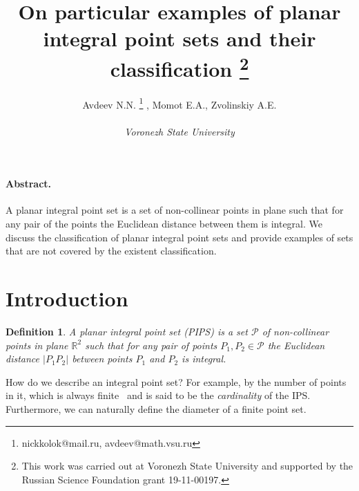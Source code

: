 \documentclass[12pt]{article}
\theoremstyle{theorem}
\theoremstyle{dfn}
\newtheorem{dfn}{Definition}
\theoremstyle{remark}
\begin{document}






\title{
	On particular examples of planar integral point sets and their classification
	\footnote{
		This work was carried out at Voronezh State University and supported by the Russian Science
		Foundation grant 19-11-00197.
	}
}

\author{
	Avdeev N.N.
	\footnote{nickkolok@mail.ru, avdeev@math.vsu.ru}
	, Momot E.A., Zvolinskiy A.E.
	\\
	\\
	\emph{Voronezh State University}
}

\maketitle

\paragraph{Abstract.}
	A planar integral point set is a set of non-collinear points in plane
	such that for any pair of the  points the Euclidean distance
	between them is integral.
	We discuss the classification of planar integral point sets
	and provide examples of sets that are not covered by the existent classification.


\section{Introduction}



\begin{dfn}\label{dfn1}
	A planar integral point set (PIPS) is a set $\mathcal{P}$
	of non-collinear points in plane $\mathbb{R}^{2}$ such that
	for any pair of points $P_{1}, P_{2} \in \mathcal{P}$
	the Euclidean distance $|P_{1}P_{2}|$
	between points $P_{1}$ and $P_{2}$ is integral.
\end{dfn}

How do we describe an integral point set?
For example, by the number of points in it, which is always finite~\cite{anning1945integral,erdos1945integral}
and is said to be the \emph{cardinality} of the IPS.
Furthermore, we can naturally %
define the diameter of a finite point set.
\end{document}
